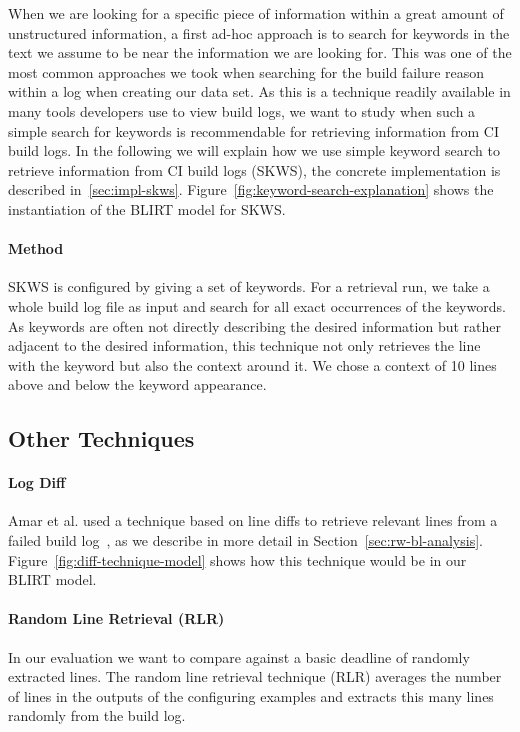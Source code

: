 \documentclass[\myrootdir/main.tex]{subfiles}
\begin{document}
When we are looking for a specific piece of information within a great amount of unstructured information, a first ad-hoc approach is to search for keywords in the text we assume to be near the information we are looking for.
This was one of the most common approaches we took when searching for the build failure reason within a log when creating our data set.
As this is a technique readily available in many tools developers use to view build logs, we want to study when such a simple search for keywords is recommendable for retrieving information from CI build logs.
In the following we will explain how we use simple keyword search to retrieve information from CI build logs (SKWS), the concrete implementation is described in~\ref{sec:impl-skws}.
Figure~\ref{fig:keyword-search-explanation} shows the instantiation of the BLIRT model for SKWS.

\paragraph{Method}
SKWS is configured by giving a set of keywords.
For a retrieval run, we take a whole build log file as input and search for all exact occurrences of the keywords.
As keywords are often not directly describing the desired information but rather adjacent to the desired information, this technique not only retrieves the line with the keyword but also the context around it.
We chose a context of 10 lines above and below the keyword appearance.


\subsection{Other Techniques}
\label{sec:expl-rlr}

\paragraph{Log Diff}
Amar et al. used a technique based on line diffs to retrieve relevant lines from a failed build log~\cite{amar2019mining}, as we describe in more detail in Section~\ref{sec:rw-bl-analysis}.
Figure~\ref{fig:diff-technique-model} shows how this technique would be in our BLIRT model.
\paragraph{Random Line Retrieval (RLR)}
In our evaluation we want to compare against a basic deadline of randomly extracted lines.
The random line retrieval technique (RLR) averages the number of lines in the outputs of the configuring examples and extracts this many lines randomly from the build log.
\end{document}
